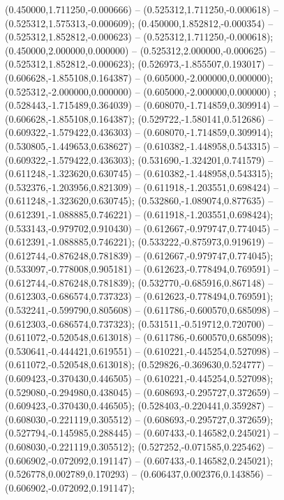  (0.450000,1.711250,-0.000666) -- (0.525312,1.711250,-0.000618) -- (0.525312,1.575313,-0.000609);
 (0.450000,1.852812,-0.000354) -- (0.525312,1.852812,-0.000623) -- (0.525312,1.711250,-0.000618);
 (0.450000,2.000000,0.000000) -- (0.525312,2.000000,-0.000625) -- (0.525312,1.852812,-0.000623);
 (0.526973,-1.855507,0.193017) -- (0.606628,-1.855108,0.164387) -- (0.605000,-2.000000,0.000000);
 (0.525312,-2.000000,0.000000) -- (0.605000,-2.000000,0.000000) ;
 (0.528443,-1.715489,0.364039) -- (0.608070,-1.714859,0.309914) -- (0.606628,-1.855108,0.164387);
 (0.529722,-1.580141,0.512686) -- (0.609322,-1.579422,0.436303) -- (0.608070,-1.714859,0.309914);
 (0.530805,-1.449653,0.638627) -- (0.610382,-1.448958,0.543315) -- (0.609322,-1.579422,0.436303);
 (0.531690,-1.324201,0.741579) -- (0.611248,-1.323620,0.630745) -- (0.610382,-1.448958,0.543315);
 (0.532376,-1.203956,0.821309) -- (0.611918,-1.203551,0.698424) -- (0.611248,-1.323620,0.630745);
 (0.532860,-1.089074,0.877635) -- (0.612391,-1.088885,0.746221) -- (0.611918,-1.203551,0.698424);
 (0.533143,-0.979702,0.910430) -- (0.612667,-0.979747,0.774045) -- (0.612391,-1.088885,0.746221);
 (0.533222,-0.875973,0.919619) -- (0.612744,-0.876248,0.781839) -- (0.612667,-0.979747,0.774045);
 (0.533097,-0.778008,0.905181) -- (0.612623,-0.778494,0.769591) -- (0.612744,-0.876248,0.781839);
 (0.532770,-0.685916,0.867148) -- (0.612303,-0.686574,0.737323) -- (0.612623,-0.778494,0.769591);
 (0.532241,-0.599790,0.805608) -- (0.611786,-0.600570,0.685098) -- (0.612303,-0.686574,0.737323);
 (0.531511,-0.519712,0.720700) -- (0.611072,-0.520548,0.613018) -- (0.611786,-0.600570,0.685098);
 (0.530641,-0.444421,0.619551) -- (0.610221,-0.445254,0.527098) -- (0.611072,-0.520548,0.613018);
 (0.529826,-0.369630,0.524777) -- (0.609423,-0.370430,0.446505) -- (0.610221,-0.445254,0.527098);
 (0.529080,-0.294980,0.438045) -- (0.608693,-0.295727,0.372659) -- (0.609423,-0.370430,0.446505);
 (0.528403,-0.220441,0.359287) -- (0.608030,-0.221119,0.305512) -- (0.608693,-0.295727,0.372659);
 (0.527794,-0.145985,0.288445) -- (0.607433,-0.146582,0.245021) -- (0.608030,-0.221119,0.305512);
 (0.527252,-0.071585,0.225462) -- (0.606902,-0.072092,0.191147) -- (0.607433,-0.146582,0.245021);
 (0.526778,0.002789,0.170293) -- (0.606437,0.002376,0.143856) -- (0.606902,-0.072092,0.191147);
